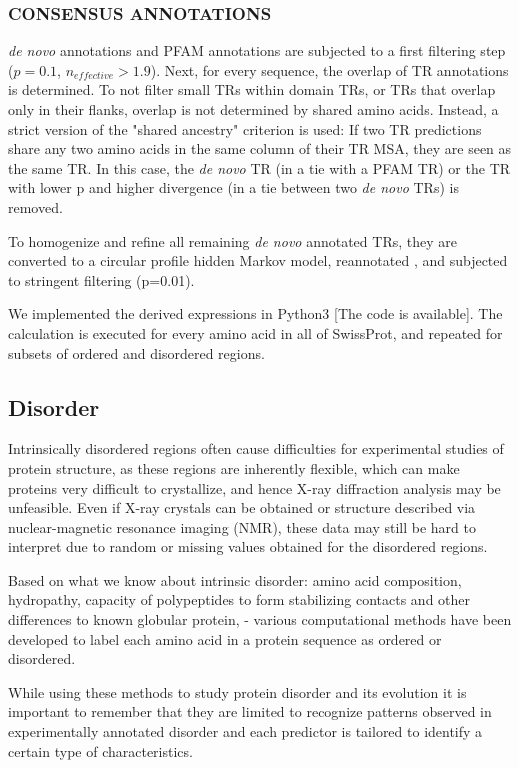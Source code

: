 \documentclass[a4,center,fleqn]{NAR}
\begin{document}
\subsubsection{\MakeUppercase{Consensus annotations}}
\textit{de novo} annotations and PFAM annotations are subjected to a first filtering step ($p=0.1$, $n_{effective}>1.9$). Next, for every sequence, the overlap of TR annotations is determined. To not filter small TRs within domain TRs, or TRs that overlap only in their flanks, overlap is not determined by shared amino acids. Instead, a strict version of the "shared ancestry" criterion is used: If two TR predictions share any two amino acids in the same column of their TR MSA, they are seen as the same TR. In this case, the \textit{de novo} TR (in a tie with a PFAM TR) or the TR with lower p and higher divergence (in a tie between two \textit{de novo} TRs) is removed.

To homogenize and refine all remaining \textit{de novo} annotated TRs, they are converted to a circular profile hidden Markov model, reannotated \cite{Schaper2014}, and subjected to stringent filtering (p=0.01).

We implemented the derived expressions in Python3 [The code is available]. The calculation is executed for every amino acid in all of SwissProt, and repeated for subsets of ordered and disordered regions.

\subsection{Disorder}
Intrinsically disordered regions often cause difficulties for experimental studies of protein structure, as these regions are inherently flexible, which can make proteins very difficult to crystallize, and hence X-ray diffraction analysis may be unfeasible. Even if X-ray crystals can be obtained or structure described via nuclear-magnetic resonance imaging (NMR), these data may still be hard to interpret due to random or missing values obtained for the disordered regions.

Based on what we know about intrinsic disorder: amino acid composition, hydropathy, capacity of polypeptides to form stabilizing contacts and other differences to known globular protein, - various computational methods have been developed to label each amino acid in a protein sequence as ordered or disordered.

While using these methods to study protein disorder and its evolution it is important to remember that they are limited to recognize patterns observed in experimentally annotated disorder and each predictor is tailored to identify a certain type of characteristics.
\end{document}
